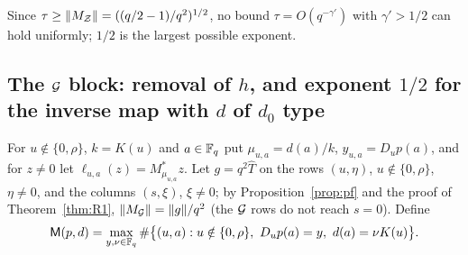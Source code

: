Since $\tau\ge\|M_{\mathcal{Z}}\|=((q/2-1)/q^2)^{1/2}$, no bound $\tau=O(q^{-\gamma'})$ with $\gamma'>1/2$ can hold uniformly; $1/2$ is the
largest possible exponent.

\subsection{The $\mathcal{G}$ block: removal of $h$, and exponent $1/2$ for the inverse map with $d$ of $d_0$ type}
For $u\notin\{0,\rho\}$, $k=K(u)$ and $a\in\mathbb{F}_q$ put $\mu_{u,a}=d(a)/k$, $y_{u,a}=D_up(a)$, and for $z\ne0$ let
$\ell_{u,a}(z)=M^*_{\mu_{u,a}}z$. Let $g=q^2\widehat T$ on the rows $(u,\eta)$, $u\notin\{0,\rho\}$, $\eta\ne0$, and the columns $(s,\xi)$,
$\xi\ne0$; by Proposition~\ref{prop:pf} and the proof of Theorem~\ref{thm:R1}, $\|M_{\mathcal{G}}\|=\|g\|/q^2$ (the $\mathcal{G}$ rows do not reach $s=0$).
Define
\[
\mathsf M(p,d)=\max_{y,\nu\in\Fq}\#\bigl\{(u,a):u\notin\{0,\rho\},\ D_up(a)=y,\ d(a)=\nu K(u)\bigr\}.
\]

